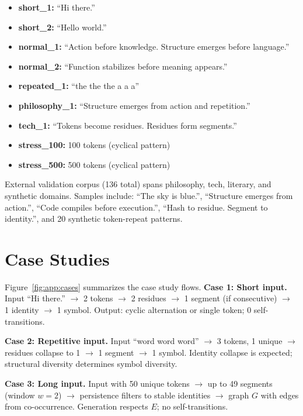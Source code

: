 \begin{itemize}
\item \textbf{short\_1:} ``Hi there.''
\item \textbf{short\_2:} ``Hello world.''
\item \textbf{normal\_1:} ``Action before knowledge. Structure emerges before language.''
\item \textbf{normal\_2:} ``Function stabilizes before meaning appears.''
\item \textbf{repeated\_1:} ``the the the a a a''
\item \textbf{philosophy\_1:} ``Structure emerges from action and repetition.''
\item \textbf{tech\_1:} ``Tokens become residues. Residues form segments.''
\item \textbf{stress\_100:} 100 tokens (cyclical pattern)
\item \textbf{stress\_500:} 500 tokens (cyclical pattern)
\end{itemize}

External validation corpus (136 total) spans philosophy, tech, literary, and synthetic domains. Samples include: ``The sky is blue.'', ``Structure emerges from action.'', ``Code compiles before execution.'', ``Hash to residue. Segment to identity.'', and 20 synthetic token-repeat patterns.

\section{Case Studies}
\label{app:cases}

Figure~\ref{fig:app:cases} summarizes the case study flows. \textbf{Case 1: Short input.}
Input ``Hi there.'' $\rightarrow$ 2 tokens $\rightarrow$ 2 residues $\rightarrow$ 1 segment (if consecutive) $\rightarrow$ 1 identity $\rightarrow$ 1 symbol. Output: cyclic alternation or single token; 0 self-transitions.

\textbf{Case 2: Repetitive input.}
Input ``word word word'' $\rightarrow$ 3 tokens, 1 unique $\rightarrow$ residues collapse to 1 $\rightarrow$ 1 segment $\rightarrow$ 1 symbol. Identity collapse is expected; structural diversity determines symbol diversity.

\textbf{Case 3: Long input.}
Input with 50 unique tokens $\rightarrow$ up to 49 segments (window $w=2$) $\rightarrow$ persistence filters to stable identities $\rightarrow$ graph $G$ with edges from co-occurrence. Generation respects $E$; no self-transitions.

